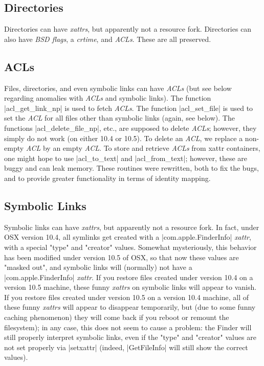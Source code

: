 \documentclass[11pt]{article}
\begin{document}
\subsection{Directories}

Directories can have \emph{xattrs}, 
but apparently not a resource fork.  Directories
can also have \emph{BSD flags}, a \emph{crtime}, and \emph{ACLs}.
These are all preserved.

\subsection{ACLs}

Files, directories, and even symbolic links can have \emph{ACLs}
(but see below regarding anomalies with \emph{ACLs} and symbolic links).
The function |acl_get_link_np| is used to fetch \emph{ACLs}.
The function |acl_set_file| is used to set the \emph{ACL}
for all files other than symbolic links (again, see below).
The functions |acl_delete_file_np|, etc., 
are supposed to delete \emph{ACLs};
however, they simply do not work (on either 10.4 or 10.5).
To delete an \emph{ACL}, we replace a non-empty \emph{ACL} by an empty \emph{ACL}.
To store and retrieve \emph{ACLs} from xattr containers, one might hope
to use |acl_to_text| and |acl_from_text|;
however, these are buggy and can leak memory.
These routines were rewritten, both to fix the bugs,
and to provide greater functionality in terms of identity mapping.






\subsection{Symbolic Links}

Symbolic links can have \emph{xattrs}, but apparently not a resource fork.  
In fact, under OSX version 10.4, 
all symlinks get created with a |com.apple.FinderInfo| \emph{xattr}, 
with a special
"type" and "creator" values.
Somewhat mysteriously, this behavior has been modified
under version 10.5 of OSX, so that now these values are "masked out",
and symbolic links will (normally) not have 
a |com.apple.FinderInfo| \emph{xattr}.
If you restore files created under version 10.4 on a version 10.5 machine,
these funny \emph{xattrs} on symbolic links will appear to vanish.
If you restore files created under version 10.5 on a version 10.4
machine, all of these funny \emph{xattrs} will appear to disappear
temporarily, but (due to some funny caching phenomenon) they will
come back if you reboot or remount the filesystem);
in any case, this does not seem to cause a problem: the Finder will
still properly interpret symbolic links, even if the "type" and "creator"
values are not set properly via |setxattr| (indeed, |GetFileInfo|
will still show the correct values).
\end{document}
